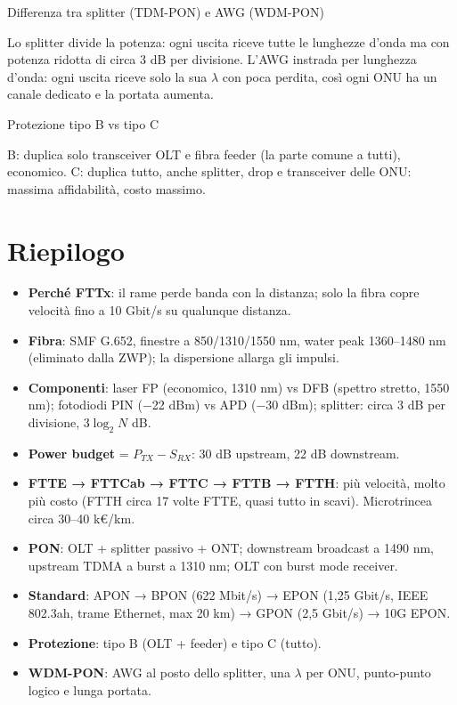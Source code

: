 \begin{approfondimento}{Differenza tra splitter (TDM-PON) e AWG (WDM-PON)}

Lo splitter divide la potenza: ogni uscita riceve tutte le lunghezze d'onda ma con potenza ridotta di circa 3 dB per divisione. L'AWG instrada per lunghezza d'onda: ogni uscita riceve solo la sua \(\lambda\) con poca perdita, così ogni ONU ha un canale dedicato e la portata aumenta.

\end{approfondimento}

\begin{approfondimento}{Protezione tipo B vs tipo C}

B: duplica solo transceiver OLT e fibra feeder (la parte comune a tutti), economico. C: duplica tutto, anche splitter, drop e transceiver delle ONU: massima affidabilità, costo massimo.

\end{approfondimento}

\section{Riepilogo}

\begin{itemize}
\tightlist
\item
  \textbf{Perché FTTx}: il rame perde banda con la distanza; solo la fibra copre velocità fino a 10 Gbit/s su qualunque distanza.
\item
  \textbf{Fibra}: SMF G.652, finestre a 850/1310/1550 nm, water peak 1360--1480 nm (eliminato dalla ZWP); la dispersione allarga gli impulsi.
\item
  \textbf{Componenti}: laser FP (economico, 1310 nm) vs DFB (spettro stretto, 1550 nm); fotodiodi PIN (−22 dBm) vs APD (−30 dBm); splitter: circa 3 dB per divisione, \(3 \log_2 N\) dB.
\item
  \textbf{Power budget} = \(P_{TX} - S_{RX}\): 30 dB upstream, 22 dB downstream.
\item
  \textbf{FTTE → FTTCab → FTTC → FTTB → FTTH}: più velocità, molto più costo (FTTH circa 17 volte FTTE, quasi tutto in scavi). Microtrincea circa 30--40 k€/km.
\item
  \textbf{PON}: OLT + splitter passivo + ONT; downstream broadcast a 1490 nm, upstream TDMA a burst a 1310 nm; OLT con burst mode receiver.
\item
  \textbf{Standard}: APON → BPON (622 Mbit/s) → EPON (1,25 Gbit/s, IEEE 802.3ah, trame Ethernet, max 20 km) → GPON (2,5 Gbit/s) → 10G EPON.
\item
  \textbf{Protezione}: tipo B (OLT + feeder) e tipo C (tutto).
\item
  \textbf{WDM-PON}: AWG al posto dello splitter, una \(\lambda\) per ONU, punto-punto logico e lunga portata.
\end{itemize}
